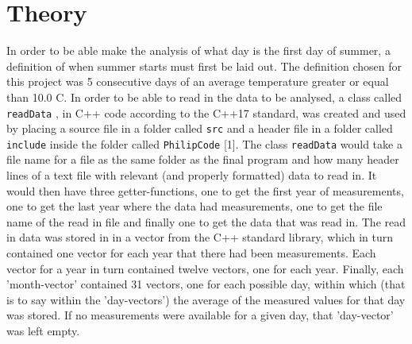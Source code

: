 \documentclass[a4, 12pt]{article}
\begin{document}
\section{Theory}
In order to be able make the analysis of what day is the first day of summer, a definition of when summer starts must first be laid out. The definition chosen for this project was 5 consecutive days of an average temperature greater or equal than 10.0 \textdegree C. \newline
\indent In order to be able to read in the data to be analysed, a class called \texttt{readData} , in C++ code according to the C++17 standard, was created and used by placing a source file in a folder called \texttt{src} and a header file in a folder called \texttt{include} inside the folder called \texttt{PhilipCode} [1]. The class \texttt{readData} would take a file name for a file as the same folder as the final program and how many header lines of a text file with relevant (and properly formatted) data to read in. It would then have three getter-functions, one to get the first year of measurements, one to get the last year where the data had measurements, one to get the file name of the read in file and finally one to get the data that was read in. The read in data was stored in in a vector from the C++ standard library, which in turn contained one vector for each year that there had been measurements. Each vector for a year in turn contained twelve vectors, one for each year. Finally, each 'month-vector' contained 31 vectors, one for each possible day, within which (that is to say within the 'day-vectors') the average of the measured values for that day was stored. If no measurements were available for a given day, that 'day-vector' was left empty. \newline
\end{document}
